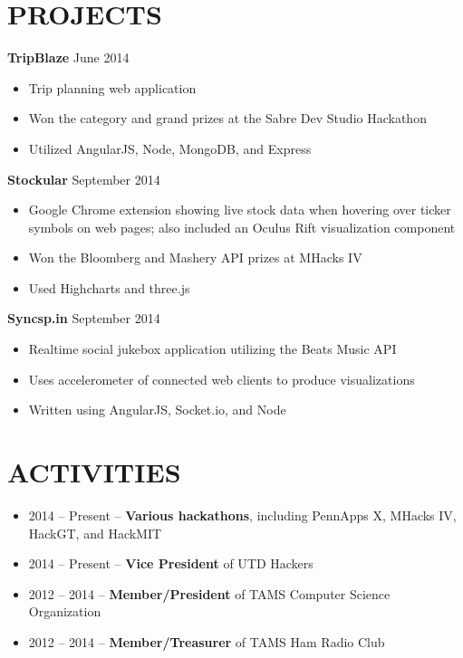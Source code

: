 \documentclass[margin, 10pt]{res} %
\begin{document}
\begin{resume}
  \section{PROJECTS}

  \textbf{TripBlaze} \hfill June 2014

  \begin{itemize} \itemsep -2pt
    \item Trip planning web application
    \item Won the category and grand prizes at the Sabre Dev Studio Hackathon
    \item Utilized AngularJS, Node, MongoDB, and Express
  \end{itemize}

  \textbf{Stockular} \hfill September 2014

  \begin{itemize} \itemsep -2pt
    \item Google Chrome extension showing live stock data when hovering over ticker symbols on web pages; also included an Oculus Rift visualization component
    \item Won the Bloomberg and Mashery API prizes at MHacks IV
    \item Used Highcharts and three.js
  \end{itemize}

  \textbf{Syncsp.in} \hfill September 2014

  \begin{itemize} \itemsep -2pt
    \item Realtime social jukebox application utilizing the Beats Music API
    \item Uses accelerometer of connected web clients to produce visualizations
    \item Written using AngularJS, Socket.io, and Node
  \end{itemize}

  \section{ACTIVITIES} 

  \begin{itemize} \itemsep -2pt
    \item 2014 -- Present -- \textbf{Various hackathons}, including PennApps X, MHacks IV, HackGT, and HackMIT
    \item 2014 -- Present -- \textbf{Vice President} of UTD Hackers
    \item 2012 -- 2014 -- \textbf{Member/President} of TAMS Computer Science Organization
    \item 2012 -- 2014 -- \textbf{Member/Treasurer} of TAMS Ham Radio Club
  \end{itemize}

\end{resume}
\end{document}
